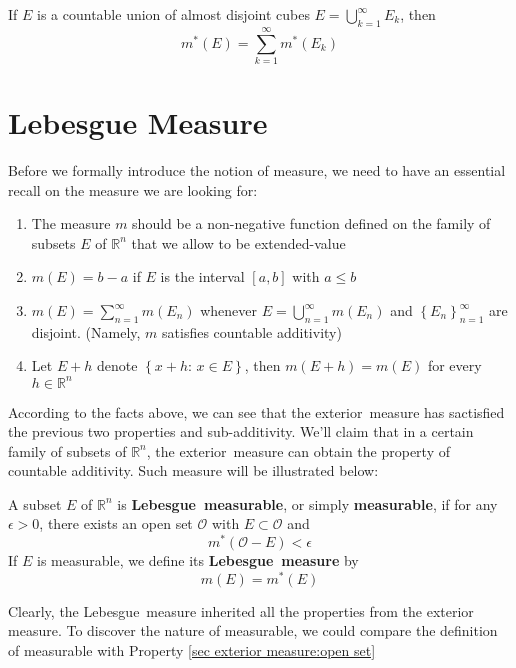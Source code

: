 \documentclass{ctexbook}
\begin{document}
\begin{prop}
    If $E$ is a countable union of almost disjoint cubes $E = \bigcup\limits_{k=1}^{\infty}E_k$, then
    \[m^*(E)=\sum\limits_{k=1}^{\infty}m^*(E_k)\]
\end{prop}

\section{Lebesgue Measure}

Before we formally introduce the notion of measure, we need to have an essential recall on the measure we are looking for:
\begin{enumerate}
    \item The measure $m$ should be a non-negative function defined on the family of subsets $E$ of $\mathbb{R}^n$ that we allow to be extended-value
    \item $m(E)=b-a$ if $E$ is the interval $\left[a,b\right] $ with $a \leq b$
    \item $m(E) = \sum\limits_{n=1}^{\infty}m(E_n)$ whenever $E = \bigcup\limits_{n=1}^{\infty}m(E_n)$ and $\left\{E_n\right\}_{n=1}^{\infty}$ are disjoint. (Namely, $m$ satisfies countable additivity)
    \item Let $E+h$ denote $\left\{x+h:\, x \in E\right\}$, then $m(E+h)=m(E)$ for every $h \in \mathbb{R}^n$
\end{enumerate}

According to the facts above, we can see that the exterior~measure has sactisfied the previous two properties and sub-additivity.
We'll claim that in a certain family of subsets of $\mathbb{R}^n$, the exterior~measure can obtain the property of countable
additivity. Such measure will be illustrated below:

\begin{define}
    A subset $E$ of $\mathbb{R}^n$ is \textbf{Lebesgue~measurable}, or simply \textbf{measurable}, if for any $\epsilon>0$,
    there exists an open set $\mathcal{O} $ with $E \subset \mathcal{O} $ and 
    \[m^*(\mathcal{O} - E) < \epsilon\]
    If $E$ is measurable, we define its \textbf{Lebesgue~measure} by \[m(E)=m^*(E)\]
\end{define}
Clearly, the Lebesgue~measure inherited all the properties from the exterior measure. To discover the nature of measurable,
we could compare the definition of measurable with Property \ref{sec exterior measure:open set}
\end{document}
